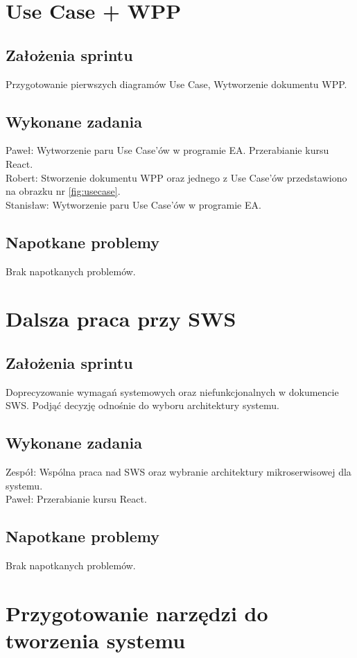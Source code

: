\documentclass[a4paper,11pt]{report}
\begin{document}
\section {Use Case + WPP}
\subsection {Założenia sprintu}
Przygotowanie pierwszych diagramów Use Case, Wytworzenie dokumentu WPP.
\subsection {Wykonane zadania}
Paweł: Wytworzenie paru Use Case'ów w programie EA. Przerabianie kursu React.\\
Robert: Stworzenie dokumentu WPP oraz jednego z Use Case'ów przedstawiono na obrazku nr \ref{fig:usecase}.\\
Stanisław: Wytworzenie paru Use Case'ów w programie EA.\\
\subsection {Napotkane problemy}
Brak napotkanych problemów.

\section {Dalsza praca przy SWS}
\subsection {Założenia sprintu}
Doprecyzowanie wymagań systemowych oraz niefunkcjonalnych w dokumencie SWS. Podjąć decyzję odnośnie do wyboru architektury systemu.
\subsection {Wykonane zadania}
Zespół: Wspólna praca nad SWS oraz wybranie architektury mikroserwisowej dla systemu.\\
Paweł: Przerabianie kursu React.\\
\subsection {Napotkane problemy}
Brak napotkanych problemów.

\section {Przygotowanie narzędzi do tworzenia systemu}
\end{document}
